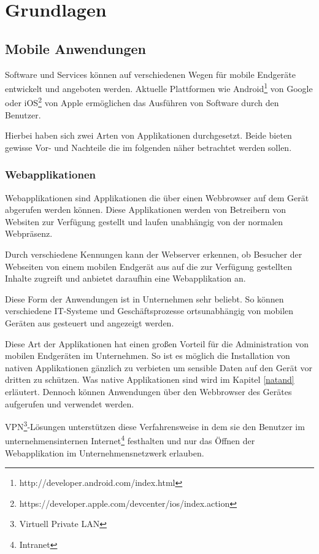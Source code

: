 \section{Grundlagen}

\subsection{Mobile Anwendungen}

Software und Services können auf verschiedenen Wegen für mobile Endgeräte entwickelt und angeboten werden. Aktuelle Plattformen wie Android\footnote{http://developer.android.com/index.html} von Google oder iOS\footnote{https://developer.apple.com/devcenter/ios/index.action} von Apple ermöglichen das Ausführen von Software durch den Benutzer.

Hierbei haben sich zwei Arten von Applikationen durchgesetzt. Beide bieten gewisse Vor- und Nachteile die im folgenden näher betrachtet werden sollen.

\subsubsection{Webapplikationen}

Webapplikationen sind Applikationen die über einen Webbrowser auf dem Gerät abgerufen werden können. Diese Applikationen werden von Betreibern von Websiten zur Verfügung gestellt und laufen unabhängig von der normalen Webpräsenz.

Durch verschiedene Kennungen kann der Webserver erkennen, ob Besucher der Webseiten von einem mobilen Endgerät aus auf die zur Verfügung gestellten Inhalte zugreift und anbietet daraufhin eine Webapplikation an.

Diese Form der Anwendungen ist in Unternehmen sehr beliebt. So können verschiedene IT-Systeme und Geschäftsprozesse ortsunabhängig von mobilen Geräten aus gesteuert und angezeigt werden.

Diese Art der Applikationen hat einen großen Vorteil für die Administration von mobilen Endgeräten im Unternehmen. So ist es möglich die Installation von nativen Applikationen gänzlich zu verbieten um sensible Daten auf den Gerät vor dritten zu schützen. Was native Applikationen sind wird im Kapitel \ref{natand} erläutert. Dennoch können Anwendungen über den Webbrowser des Gerätes aufgerufen und verwendet werden.

VPN\footnote{Virtuell Private LAN}-Lösungen unterstützen diese Verfahrensweise in dem sie den Benutzer im unternehmensinternen Internet\footnote{Intranet} festhalten und nur das Öffnen der Webapplikation im Unternehmensnetzwerk erlauben.

